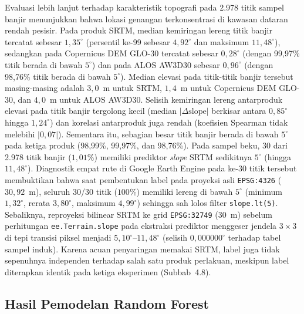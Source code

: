 \documentclass[12pt]{article}
\begin{document}
Evaluasi lebih lanjut terhadap karakteristik topografi pada 2.978 titik sampel
banjir menunjukkan bahwa lokasi genangan terkonsentrasi di kawasan dataran
rendah pesisir. Pada produk SRTM, median kemiringan lereng titik banjir
tercatat sebesar $1{,}35^{\circ}$ (persentil ke-99 sebesar $4{,}92^{\circ}$
dan maksimum $11{,}48^{\circ}$), sedangkan pada Copernicus DEM GLO-30 tercatat
sebesar $0{,}28^{\circ}$ (dengan 99,97\% titik berada di bawah $5^{\circ}$)
dan pada ALOS AW3D30 sebesar $0{,}96^{\circ}$ (dengan 98,76\% titik berada di
bawah $5^{\circ}$). Median elevasi pada titik-titik banjir tersebut
masing-masing adalah $3{,}0$~m untuk SRTM, $1{,}4$~m untuk Copernicus DEM
GLO-30, dan $4{,}0$~m untuk ALOS AW3D30. Selisih kemiringan lereng antarproduk
elevasi pada titik banjir tergolong kecil (median $|\Delta\text{slope}|$
berkisar antara $0{,}85^{\circ}$ hingga $1{,}24^{\circ}$) dan korelasi
antarproduk juga rendah (koefisien Spearman tidak melebihi $|0{,}07|$).
Sementara itu, sebagian besar titik banjir berada di bawah $5^{\circ}$ pada
ketiga produk (98,99\%, 99,97\%, dan 98,76\%). Pada sampel beku, 30 dari
2.978 titik banjir ($1{,}01\%$) memiliki prediktor \textit{slope} SRTM
sedikitnya $5^{\circ}$ (hingga $11{,}48^{\circ}$). Diagnostik empat rute di
Google Earth Engine pada ke-30 titik tersebut membuktikan bahwa saat
pembentukan label pada proyeksi asli \texttt{EPSG:4326} ($30{,}92$~m),
seluruh 30/30 titik ($100\%$) memiliki lereng di bawah $5^{\circ}$ (minimum
$1{,}32^{\circ}$, rerata $3{,}80^{\circ}$, maksimum $4{,}99^{\circ}$)
sehingga sah lolos filter \texttt{slope.lt(5)}. Sebaliknya, reproyeksi
bilinear SRTM ke grid \texttt{EPSG:32749} (30~m) sebelum perhitungan
\texttt{ee.Terrain.slope} pada ekstraksi prediktor menggeser jendela
$3\times3$ di tepi transisi piksel menjadi $5{,}10^{\circ}$--$11{,}48^{\circ}$
(selisih $0{,}000000^{\circ}$ terhadap tabel sampel induk). Karena acuan
penyaringan memakai SRTM, label juga tidak sepenuhnya independen terhadap
salah satu produk perlakuan, meskipun label diterapkan identik pada ketiga
eksperimen (Subbab~4.8).

\subsection{Hasil Pemodelan Random Forest}
\end{document}
